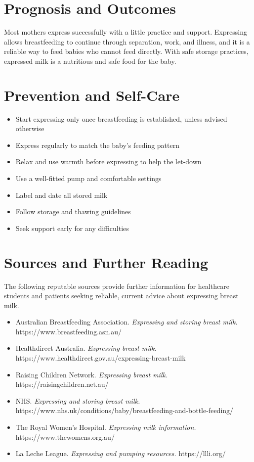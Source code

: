 \section*{Prognosis and Outcomes}
Most mothers express successfully with a little practice and support. Expressing allows breastfeeding to continue through separation, work, and illness, and it is a reliable way to feed babies who cannot feed directly. With safe storage practices, expressed milk is a nutritious and safe food for the baby.

\section*{Prevention and Self-Care}
\begin{itemize}
    \item Start expressing only once breastfeeding is established, unless advised otherwise
    \item Express regularly to match the baby's feeding pattern
    \item Relax and use warmth before expressing to help the let-down
    \item Use a well-fitted pump and comfortable settings
    \item Label and date all stored milk
    \item Follow storage and thawing guidelines
    \item Seek support early for any difficulties
\end{itemize}

\section*{Sources and Further Reading}
The following reputable sources provide further information for healthcare students and patients seeking reliable, current advice about expressing breast milk.
\begin{itemize}
    \item Australian Breastfeeding Association. \textit{Expressing and storing breast milk.} https://www.breastfeeding.asn.au/
    \item Healthdirect Australia. \textit{Expressing breast milk.} https://www.healthdirect.gov.au/expressing-breast-milk
    \item Raising Children Network. \textit{Expressing breast milk.} https://raisingchildren.net.au/
    \item NHS. \textit{Expressing and storing breast milk.} https://www.nhs.uk/conditions/baby/breastfeeding-and-bottle-feeding/
    \item The Royal Women's Hospital. \textit{Expressing milk information.} https://www.thewomens.org.au/
    \item La Leche League. \textit{Expressing and pumping resources.} https://llli.org/
\end{itemize}
